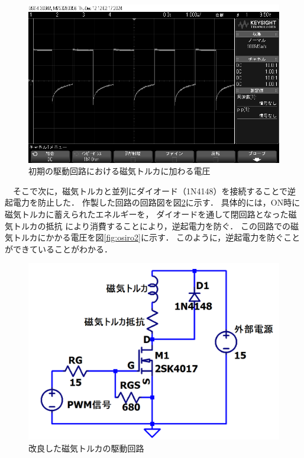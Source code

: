 \begin{figure}[H]
	\centering
		\includegraphics[scale=0.25]{./figure/scope_5.png}
		\caption{初期の駆動回路における磁気トルカに加わる電圧}
		\label{fig:osiro1}
\end{figure}


　そこで次に，磁気トルカと並列にダイオード（1N4148）を接続することで逆起電力を防止した．
作製した回路の回路図を図\ref{fig:cirkit}に示す．
具体的には，ON時に磁気トルカに蓄えられたエネルギーを，
ダイオードを通して閉回路となった磁気トルカの抵抗
により消費することにより，逆起電力を防ぐ．
この回路での磁気トルカにかかる電圧を図\ref{fig:osiro2}に示す．
このように，逆起電力を防ぐことができていることがわかる．


\begin{figure}[H]
	\centering
		\includegraphics[scale=0.3]{./figure/駆動回路.png}
		\caption{改良した磁気トルカの駆動回路}
		\label{fig:cirkit}
\end{figure}

